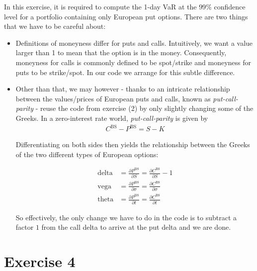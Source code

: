 \documentclass[10pt,a4paper]{article}
\theoremstyle{definition}
\begin{document}
	In this exercise, it is required to compute the 1-day VaR at the $99\%$ confidence level for a portfolio containing only European put options. There are two things that we have to be careful about:
	
	\begin{itemize}
	
	\item Definitions of moneyness differ for puts and calls. Intuitively, we want a value larger than 1 to mean that the option is in the money. Consequently, moneyness for calls is commonly defined to be spot/strike and moneyness for puts to be strike/spot. In our code we arrange for this subtle difference.
	
	\item  Other than that, we may however - thanks to an intricate relationship between the values/prices of European puts and calls, known as \emph{put-call-parity} \cite{G03} - reuse the code from exercise (2) by only slightly changing some of the Greeks. In a zero-interest rate world, \emph{put-call-parity} is given by	
	\begin{align*}
	C^{\text{BS}}- P^{\text{BS}} = S - K
	\end{align*}
	
	Differentiating on both sides then yields the relationship between the Greeks of the two different types of European options:
	
	\begin{align}
	\text{delta} &= \frac{\partial P^{\text{BS}}}{\partial S} = \frac{\partial C^{\text{BS}}}{\partial S} -1  \\
	\text{vega} &= \frac{\partial P^{\text{BS}}}{\partial \sigma} = \frac{\partial C^{\text{BS}}}{\partial \sigma} \\
	\text{theta} &= \frac{\partial P^{\text{BS}}}{\partial t} = \frac{\partial C^{\text{BS}}}{\partial t}
	\end{align}
	
	So effectively, the only change we have to do in the code is to subtract a factor $1$ from the call delta to arrive at the put delta and we are done.
	
	\end{itemize}
	
	
	\section*{Exercise 4}
	
\end{document}
